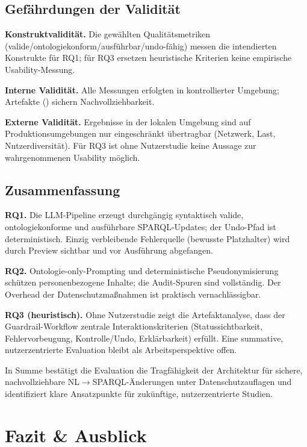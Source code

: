 \section{Gefährdungen der Validität}
\label{sec:validity}

\textbf{Konstruktvalidität.} Die gewählten Qualitätsmetriken (valide/ontologiekonform/ausführbar/undo-fähig) messen die intendierten Konstrukte für RQ1; für RQ3 ersetzen heuristische Kriterien keine empirische Usability-Messung.

\textbf{Interne Validität.} Alle Messungen erfolgten in kontrollierter Umgebung; Artefakte () sichern Nachvollziehbarkeit.

\textbf{Externe Validität.} Ergebnisse in der lokalen Umgebung sind auf Produktionsumgebungen nur eingeschränkt übertragbar (Netzwerk, Last, Nutzerdiversität). Für RQ3 ist ohne Nutzerstudie keine Aussage zur wahrgenommenen Usability möglich.

\section{Zusammenfassung}
\label{sec:eval-fazit}

\textbf{RQ1.} Die LLM-Pipeline erzeugt durchgängig syntaktisch valide, ontologiekonforme und ausführbare SPARQL-Updates; der Undo-Pfad ist deterministisch. Einzig verbleibende Fehlerquelle (bewusste Platzhalter) wird durch Preview sichtbar und vor Ausführung abgefangen.

\textbf{RQ2.} Ontologie-only-Prompting und deterministische Pseudonymisierung schützen personenbezogene Inhalte; die Audit-Spuren sind vollständig. Der Overhead der Datenschutzmaßnahmen ist praktisch vernachlässigbar.

\textbf{RQ3 (heuristisch).} Ohne Nutzerstudie zeigt die Artefaktanalyse, dass der Guardrail-Workflow zentrale Interaktionskriterien (Statussichtbarkeit, Fehlervorbeugung, Kontrolle/Undo, Erklärbarkeit) erfüllt. Eine summative, nutzerzentrierte Evaluation bleibt als Arbeitsperspektive offen.

In Summe bestätigt die Evaluation die Tragfähigkeit der Architektur für sichere, nachvollziehbare NL$\rightarrow$SPARQL-Änderungen unter Datenschutzauflagen und identifiziert klare Ansatzpunkte für zukünftige, nutzerzentrierte Studien.






\chapter{Fazit \& Ausblick}
\label{sec:fazit}

